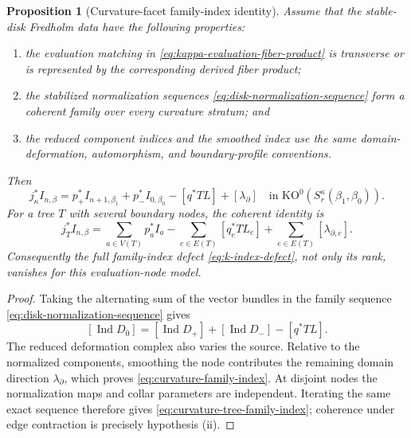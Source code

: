 \documentclass[11pt,letterpaper,twoside]{article}
\theoremstyle{plain}
\newtheorem{proposition}[theorem]{Proposition}
\theoremstyle{definition}
\theoremstyle{remark}
\newcommand{\Ind}{\operatorname{Ind}}
\begin{document}
\begin{proposition}[Curvature-facet family-index identity]\label{prop:curvature-family-index}
Assume that the stable-disk Fredholm data have the following properties:
\begin{enumerate}[label=\textup{(\roman*)}]
\item the evaluation matching in \eqref{eq:kappa-evaluation-fiber-product} is transverse or is represented by the corresponding derived fiber product;
\item the stabilized normalization sequences \eqref{eq:disk-normalization-sequence} form a coherent family over every curvature stratum; and
\item the reduced component indices and the smoothed index use the same domain-deformation, automorphism, and boundary-profile conventions.
\end{enumerate}
Then
\begin{equation}\label{eq:curvature-family-index}
 j_\kappa^*I_{n,\beta}
 =p_+^*I_{n+1,\beta_1}
 +p_-^*I_{0,\beta_0}
 -[q^*TL]+[\lambda_\partial]
 \quad\text{in }\mathrm{KO}^0(S^\kappa_r(\beta_1,\beta_0)).
\end{equation}
For a tree \(T\) with several boundary nodes, the coherent identity is
\begin{equation}\label{eq:curvature-tree-family-index}
 j_T^*I_{n,\beta}
 =\sum_{a\in V(T)}p_a^*I_a
 -\sum_{e\in E(T)}[q_e^*TL_e]
 +\sum_{e\in E(T)}[\lambda_{\partial,e}].
\end{equation}
Consequently the full family-index defect \eqref{eq:k-index-defect}, not only its rank, vanishes for this evaluation-node model.
\end{proposition}

\begin{proof}
Taking the alternating sum of the vector bundles in the family sequence \eqref{eq:disk-normalization-sequence} gives
\[
 [\Ind D_0]=[\Ind D_+]+[\Ind D_-]-[q^*TL].
\]
The reduced deformation complex also varies the source.  Relative to the normalized components, smoothing the node contributes the remaining domain direction \(\lambda_\partial\), which proves \eqref{eq:curvature-family-index}.  At disjoint nodes the normalization maps and collar parameters are independent.  Iterating the same exact sequence therefore gives \eqref{eq:curvature-tree-family-index}; coherence under edge contraction is precisely hypothesis \textup{(ii)}.
\end{proof}
\end{document}
